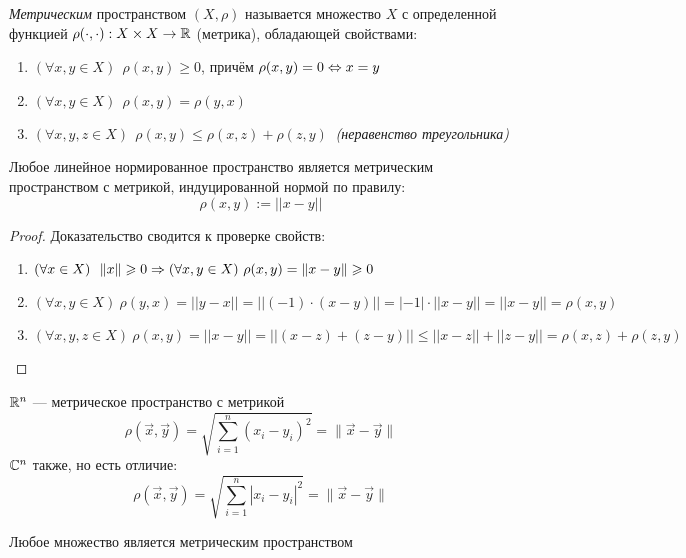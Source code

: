 \begin{definition}
	\textit{Метрическим} пространством $(X, \rho)$ называется множество
	$X$ с определенной функцией $\rho(\cdot, \cdot):
	X \times X \rightarrow \mathbb{R}$ (метрика),
	обладающей свойствами:
	\begin{enumerate}
		\item $(\forall x, y \in X)\ \ \rho(x, y) \ge 0$,
			причём $\rho(x, y) = 0 \Leftrightarrow x = y$
		
		\item $(\forall x, y \in X)\ \ \rho(x, y) =
			\rho(y, x)$
		
		\item $(\forall x, y, z \in X)\ \ \rho(x, y)
			\le \rho(x, z) + \rho(z, y)\ $ \textit{(неравенство треугольника)}
	\end{enumerate}
\end{definition}

\begin{lemma}
	Любое линейное нормированное пространство является
	метрическим пространством с метрикой, индуцированной
	нормой по правилу:
	\[
		\rho(x, y) := ||x - y||
	\]
\end{lemma}

\begin{proof}
	Доказательство сводится к проверке свойств:
	\begin{enumerate}
		\item $(\forall x \in X)\ \ \|x\| \ge 0
			\Ra (\forall x, y \in X)\ 
			\rho(x, y) = \|x - y\| \ge 0$
		
		\item
		$
			(\forall x, y \in X)\ 
			\rho(y, x) = ||y - x|| = ||(-1) \cdot (x - y)||
			= |-1| \cdot ||x - y|| = ||x - y|| = \rho(x, y)
		$
		
		\item 
		$
			(\forall x, y, z \in X)\ 
			\rho(x, y) = ||x - y|| = ||(x - z) + (z - y)||
			\le ||x - z|| + ||z - y|| = \rho(x, z) + \rho(z, y)
		$
	\end{enumerate}
\end{proof}

\begin{corollary}
	$\mathbb{R}^n$ --- метрическое пространство с метрикой
	\[
		\rho(\vec{x}, \vec{y}) = \sqrt{\sum_{i = 1}^{n}
		(x_i - y_i)^2} = \|\vec{x} - \vec{y}\|
	\]
	$\mathbb{C}^n$ также, но есть отличие:
	\[
		\rho(\vec{x}, \vec{y}) = \sqrt{\sum_{i = 1}^{n}
		|x_i - y_i|^2} = \|\vec{x} - \vec{y}\|
	\]
\end{corollary}

\begin{proposition}
	Любое множество является метрическим пространством
\end{proposition}

